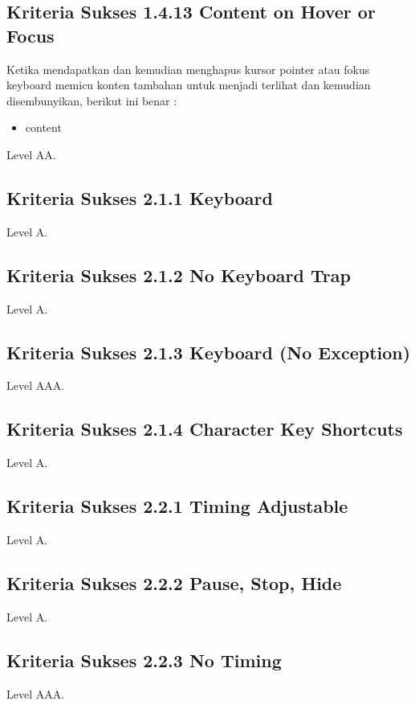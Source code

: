 \subsection{Kriteria Sukses 1.4.13 Content on Hover or Focus}
\label{sec:kriteria_1.4.13}
Ketika mendapatkan dan kemudian menghapus kursor pointer atau fokus keyboard memicu konten tambahan untuk menjadi terlihat dan kemudian disembunyikan, berikut ini benar :
\begin{itemize}
	\item content
\end{itemize}
Level AA.

\subsection{Kriteria Sukses 2.1.1 Keyboard}
\label{sec:kriteria_2.1.1}
Level A.

\subsection{Kriteria Sukses 2.1.2 No Keyboard Trap}
\label{sec:kriteria_2.1.2}
Level A.

\subsection{Kriteria Sukses 2.1.3 Keyboard (No Exception)}
\label{sec:kriteria_2.1.3}
Level AAA.

\subsection{Kriteria Sukses 2.1.4 Character Key Shortcuts}
\label{sec:kriteria_2.1.4}
Level A.

\subsection{Kriteria Sukses 2.2.1 Timing Adjustable}
\label{sec:kriteria_2.2.1}
Level A.

\subsection{Kriteria Sukses 2.2.2 Pause, Stop, Hide}
\label{sec:kriteria_2.2.2}
Level A.

\subsection{Kriteria Sukses 2.2.3 No Timing}
\label{sec:kriteria_2.2.3}
Level AAA.

